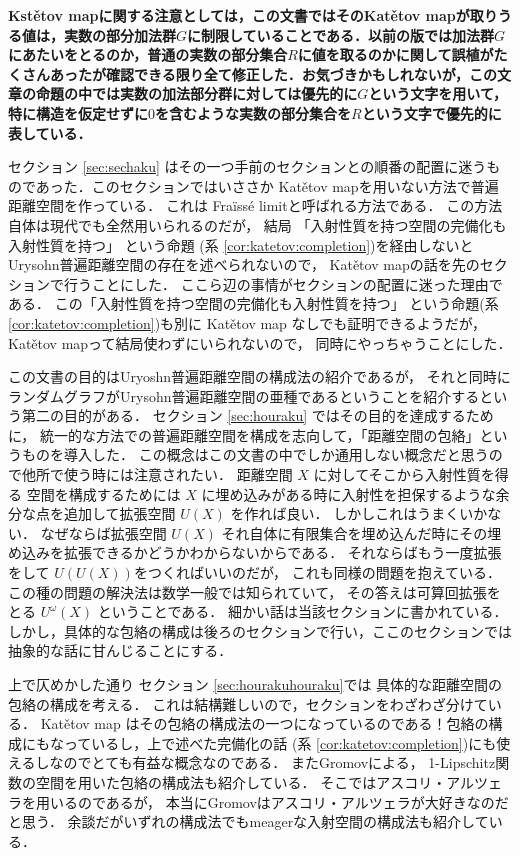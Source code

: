\documentclass[leqno, 12pt]{jsarticle}
\begin{document}
\textbf{Kst\v{e}tov mapに関する注意としては，この文書ではそのKat\v{e}tov mapが取りうる値は，実数の部分加法群$G$に制限していることである．以前の版では加法群$G$にあたいをとるのか，普通の実数の部分集合$R$に値を取るのかに関して誤植がたくさんあったが確認できる限り全て修正した．お気づきかもしれないが，この文章の命題の中では実数の加法部分群に対しては優先的に$G$という文字を用いて，特に構造を仮定せずに$0$を含むような実数の部分集合を$R$という文字で優先的に表している．}

セクション
\ref{sec:sechaku}
はその一つ手前のセクションとの順番の配置に迷うものであった．このセクションではいささか
Kat\v{e}tov
mapを用いない方法で普遍距離空間を作っている．
これは
Fra\"{i}ss\'{e} limitと呼ばれる方法である．
この方法自体は現代でも全然用いられるのだが，
結局
「入射性質を持つ空間の完備化も入射性質を持つ」
という命題
(系
\ref{cor:katetov:completion})を経由しないとUrysohn普遍距離空間の存在を述べられないので，
Kat\v{e}tov mapの話を先のセクションで行うことにした．
ここら辺の事情がセクションの配置に迷った理由である．
この「入射性質を持つ空間の完備化も入射性質を持つ」
という命題(系\ref{cor:katetov:completion})も別に
Kat\v{e}tov map
なしでも証明できるようだが，
Kat\v{e}tov mapって結局使わずにいられないので，
同時にやっちゃうことにした．



この文書の目的はUryoshn普遍距離空間の構成法の紹介であるが，
それと同時にランダムグラフがUrysohn普遍距離空間の亜種であるということを紹介するという第二の目的がある．
セクション
\ref{sec:houraku}
ではその目的を達成するために，
統一的な方法での普遍距離空間を構成を志向して，「距離空間の包絡」というものを導入した．
この概念はこの文書の中でしか通用しない概念だと思うので他所で使う時には注意されたい．
距離空間
$X$
に対してそこから入射性質を得る
空間を構成するためには
$X$
に埋め込みがある時に入射性を担保するような余分な点を追加して拡張空間
$U(X)$
を作れば良い．
しかしこれはうまくいかない．
なぜならば拡張空間
$U(X)$
それ自体に有限集合を埋め込んだ時にその埋め込みを拡張できるかどうかわからないからである．
それならばもう一度拡張をして
$U(U(X))$をつくればいいのだが，
これも同様の問題を抱えている．
この種の問題の解決法は数学一般では知られていて，
その答えは可算回拡張をとる
$U^{\omega}(X)$
ということである．
細かい話は当該セクションに書かれている．
しかし，具体的な包絡の構成は後ろのセクションで行い，ここのセクションでは抽象的な話に甘んじることにする．



上で仄めかした通り
セクション
\ref{sec:hourakuhouraku}では
具体的な距離空間の包絡の構成を考える．
これは結構難しいので，セクションをわざわざ分けている．
Kat\v{e}tov map
はその包絡の構成法の一つになっているのである！包絡の構成にもなっているし，上で述べた完備化の話
(系
\ref{cor:katetov:completion})にも使えるしなのでとても有益な概念なのである．
またGromovによる，
1-Lipschitz関数の空間を用いた包絡の構成法も紹介している．
そこではアスコリ・アルツェラを用いるのであるが，
本当にGromovはアスコリ・アルツェラが大好きなのだと思う．
余談だがいずれの構成法でもmeagerな入射空間の構成法も紹介している．
\end{document}
